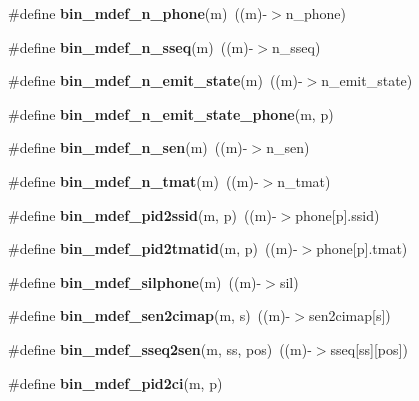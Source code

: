 \begin{DoxyCompactItemize}
\item 
\#define {\bfseries bin\-\_\-mdef\-\_\-n\-\_\-phone}(m)~((m)-\/$>$n\-\_\-phone)\label{bin__mdef_8h_af85788051ca16ad0d4be0bb4740ecf37}

\item 
\#define {\bfseries bin\-\_\-mdef\-\_\-n\-\_\-sseq}(m)~((m)-\/$>$n\-\_\-sseq)\label{bin__mdef_8h_aff6ddbc2ff917ad3aa8cfebf354307d1}

\item 
\#define {\bfseries bin\-\_\-mdef\-\_\-n\-\_\-emit\-\_\-state}(m)~((m)-\/$>$n\-\_\-emit\-\_\-state)\label{bin__mdef_8h_ad15b963c74030cb2826c73c55ad5fe6b}

\item 
\#define {\bfseries bin\-\_\-mdef\-\_\-n\-\_\-emit\-\_\-state\-\_\-phone}(m, p)
\item 
\#define {\bfseries bin\-\_\-mdef\-\_\-n\-\_\-sen}(m)~((m)-\/$>$n\-\_\-sen)\label{bin__mdef_8h_a74b85bdbd4a8e47eba903a2c9f7ce968}

\item 
\#define {\bfseries bin\-\_\-mdef\-\_\-n\-\_\-tmat}(m)~((m)-\/$>$n\-\_\-tmat)\label{bin__mdef_8h_ab3acd37e62c109c4abcd933a713e837f}

\item 
\#define {\bfseries bin\-\_\-mdef\-\_\-pid2ssid}(m, p)~((m)-\/$>$phone[p].ssid)\label{bin__mdef_8h_ae2377a0b44df75e0f7e0fd20ca143fea}

\item 
\#define {\bfseries bin\-\_\-mdef\-\_\-pid2tmatid}(m, p)~((m)-\/$>$phone[p].tmat)\label{bin__mdef_8h_ae5c4319a3245f65ea397a7b1cad4ac79}

\item 
\#define {\bfseries bin\-\_\-mdef\-\_\-silphone}(m)~((m)-\/$>$sil)\label{bin__mdef_8h_a0fe77933739b960287855bdd4451aa09}

\item 
\#define {\bfseries bin\-\_\-mdef\-\_\-sen2cimap}(m, s)~((m)-\/$>$sen2cimap[s])\label{bin__mdef_8h_a3849ea9a9101990d045b8afcc0c273fb}

\item 
\#define {\bfseries bin\-\_\-mdef\-\_\-sseq2sen}(m, ss, pos)~((m)-\/$>$sseq[ss][pos])\label{bin__mdef_8h_aab50d23120a2310909697b7159360d80}

\item 
\#define {\bfseries bin\-\_\-mdef\-\_\-pid2ci}(m, p)
\end{DoxyCompactItemize}
